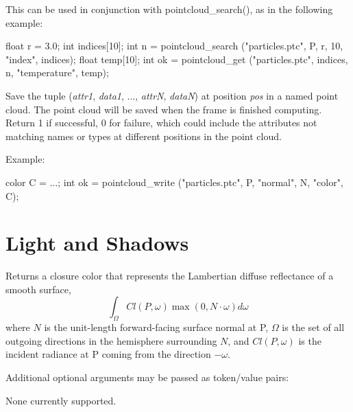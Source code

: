 \documentclass[11pt,letterpaper]{book}
\def\P{{\cf P}\xspace}
\def\colorclosure{{\cf closure color}\xspace}
\begin{document}
This can be used in conjunction with {\cf pointcloud_search()}, as
in the following example:

\begin{code}
      float r = 3.0;
      int indices[10];
      int n = pointcloud_search ("particles.ptc", P, r, 10,
                                 "index", indices);
      float temp[10];
      int ok = pointcloud_get ("particles.ptc", indices, n,
                               "temperature", temp);
\end{code}
\apiend




Save the tuple (\emph{attr1}, \emph{data1}, ..., \emph{attrN},
\emph{dataN}) at position \emph{pos} in a named point cloud.  The point
cloud will be saved when the frame is finished computing.  Return 1 if
successful, 0 for failure, which could include the attributes not
matching names or types at different positions in the point cloud.

Example:
\begin{code}
      color C = ...;
      int ok = pointcloud_write ("particles.ptc", P, "normal", N, "color", C);
\end{code}
\apiend


\newpage
\section{Light and Shadows}
\label{sec:stdlib:light}

\apiitem{\colorclosure\ {\ce diffuse} (normal N, \pl)}

Returns a \colorclosure that represents the Lambertian diffuse
reflectance of a smooth surface,
$$ \int_{\Omega}{Cl(P,\omega) \max(0, N \cdot \omega) d\omega} $$
where $N$ is the unit-length forward-facing surface normal at \P,
$\Omega$ is the set of all outgoing directions in the hemisphere
surrounding $N$, and $Cl(P,\omega)$ is the incident radiance at
\P coming from the direction $-\omega$.

Additional optional arguments may be passed as token/value pairs:

\hspace{0.5in}None currently supported.
\vspace{.25in}
\end{document}
